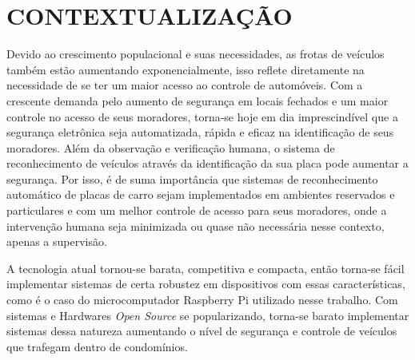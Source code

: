 
 
\chapter{\textbf{\uppercase{Contextualização}}}\label{cap_1}

Devido ao crescimento populacional e suas necessidades, as frotas de veículos também estão aumentando exponencialmente, isso reflete diretamente na necessidade de se ter um maior acesso ao controle de automóveis. Com a crescente demanda pelo aumento de segurança em locais fechados e um maior controle no acesso de seus moradores, torna-se hoje em dia imprescindível que a segurança eletrônica seja automatizada, rápida e eficaz na identificação de seus moradores. Além da observação e verificação humana, o sistema de reconhecimento de veículos através da identificação da sua placa pode aumentar a segurança. Por isso, é de suma importância que sistemas de reconhecimento automático de placas de carro sejam implementados em ambientes reservados e particulares e com um melhor controle de acesso para seus moradores, onde a intervenção humana seja minimizada ou quase não necessária nesse contexto, apenas a supervisão. 

A tecnologia atual tornou-se barata, competitiva e compacta, então torna-se fácil implementar sistemas de certa robustez em dispositivos com essas características, como é o caso do microcomputador Raspberry Pi utilizado nesse trabalho. Com sistemas e Hardwares \textit{Open Source} se popularizando, torna-se barato implementar sistemas dessa natureza aumentando o nível de segurança e controle de veículos que trafegam dentro de condomínios.

